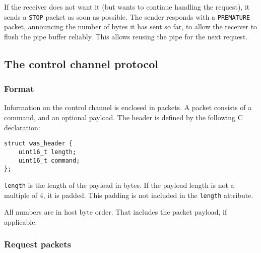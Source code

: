 \documentclass[a4paper,12pt]{article}
\begin{document}
If the receiver does not want it (but wants to continue handling the
request), it sends a \texttt{STOP} packet as soon as possible.  The
sender responds with a \texttt{PREMATURE} packet, announcing the number
of bytes it has sent so far, to allow the receiver to flush the pipe
buffer reliably.  This allows reusing the pipe for the next request.

\subsection{The control channel protocol}

\subsubsection{Format}

Information on the control channel is enclosed in packets.  A packet
consists of a command, and an optional payload.  The header is defined
by the following C declaration:

\begin{verbatim}
struct was_header {
    uint16_t length;
    uint16_t command;
};
\end{verbatim}

\texttt{length} is the length of the payload in bytes.  If the payload
length is not a multiple of 4, it is padded.  This padding is not
included in the \texttt{length} attribute.

All numbers are in host byte order.  That includes the packet payload,
if applicable.

\subsubsection{Request packets}
\end{document}
